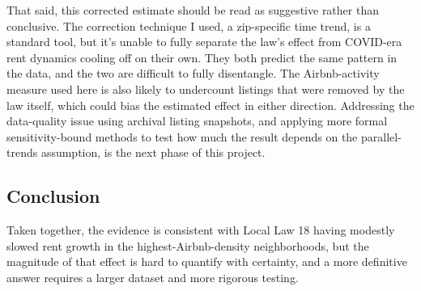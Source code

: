 \documentclass[
  11pt,
]{article}
\begin{document}
That said, this corrected estimate should be read as suggestive rather
than conclusive. The correction technique I used, a zip-specific time
trend, is a standard tool, but it's unable to fully separate the law's
effect from COVID-era rent dynamics cooling off on their own. They both
predict the same pattern in the data, and the two are difficult to fully
disentangle. The Airbnb-activity measure used here is also likely to
undercount listings that were removed by the law itself, which could
bias the estimated effect in either direction. Addressing the
data-quality issue using archival listing snapshots, and applying more
formal sensitivity-bound methods to test how much the result depends on
the parallel-trends assumption, is the next phase of this project.

\subsection{Conclusion}\label{conclusion}

Taken together, the evidence is consistent with Local Law 18 having
modestly slowed rent growth in the highest-Airbnb-density neighborhoods,
but the magnitude of that effect is hard to quantify with certainty, and
a more definitive answer requires a larger dataset and more rigorous
testing.
\end{document}
